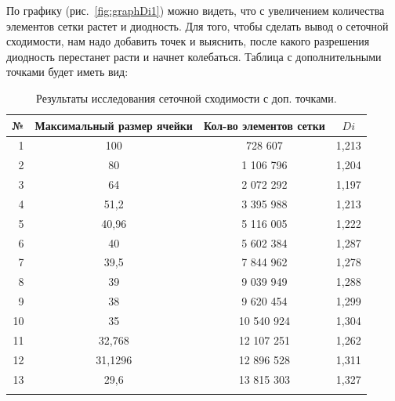 \documentclass[14pt,a4paper]{article}
\begin{document}
        По графику (рис.~\ref{fig:graphDi1}) можно видеть, что с увеличением количества элементов сетки растет и диодность. Для того, чтобы сделать вывод о сеточной сходимости, нам надо добавить точек и выяснить, после какого разрешения диодность перестанет расти и начнет колебаться. Таблица с дополнительными точками будет иметь вид:
        \\
         \begin{table}[!htb]
            \begin{center}
                \caption{Результаты исследования сеточной сходимости с доп. точками.}
                 \begin{tabular}{rccc}
                     \hline
                     №      & Максимальный размер ячейки & Кол-во элементов сетки  & $Di$ \\
                     \hline
                     \hline
                     1	& 100		& 728 607		& 1,213		\\
                     2	& 80		& 1 106 796		& 1,204		\\
                     3  & 64		& 2 072 292		& 1,197		\\
                     4	& 51,2		& 3 395 988		& 1,213		\\
                     5	& 40,96		& 5 116 005		& 1,222		\\
                     6	& 40		& 5 602 384		& 1,287		\\
                     7	& 39,5		& 7 844 962		& 1,278		\\
                     8	& 39		& 9 039 949		& 1,288		\\
                     9	& 38		& 9 620 454		& 1,299		\\		
                     10	& 35		& 10 540 924	& 1,304		\\
                     11	& 32,768	& 12 107 251	& 1,262		\\
                     12	& 31,1296	& 12 896 528	& 1,311		\\
                     13	& 29,6		& 13 815 303	& 1,327		\\
                     \hline
                     \label{fig:table2}
                 \end{tabular}
            \label{tab:tab2} 
            \end{center}
        \end{table}
         \\
         
         
         
\end{document}
